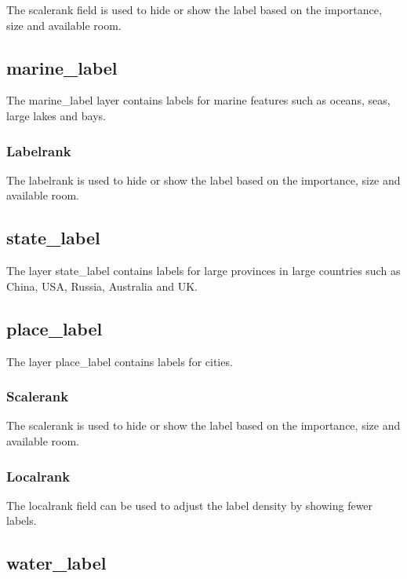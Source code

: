 The scalerank field is used to hide or show the label based on the
importance, size and available room.

\subsection*{marine\_label}\label{marine_label}

The marine\_label layer contains labels for marine features such as
oceans, seas, large lakes and bays.

\subsubsection*{Labelrank}\label{labelrank}

The labelrank is used to hide or show the label based on the importance,
size and available room.

\subsection*{state\_label}\label{state_label}

The layer state\_label contains labels for large provinces in large
countries such as China, USA, Russia, Australia and UK.

\subsection*{place\_label}\label{place_label}

The layer place\_label contains labels for cities.

\subsubsection*{Scalerank}\label{scalerank-1}

The scalerank is used to hide or show the label based on the importance,
size and available room.

\subsubsection*{Localrank}\label{localrank}

The localrank field can be used to adjust the label density by showing
fewer labels.

\subsection*{water\_label}\label{water_label}

